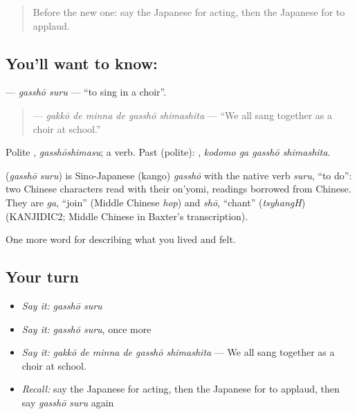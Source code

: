 \label{lesson:JA-C471-gasshou-suru}



\begin{quote}
Before the new one: say the Japanese for acting, then the Japanese for to applaud.
\end{quote}

\subsection*{You'll want to know: }
\textbf{} — \emph{gasshō suru} — \textquotedblleft{}to sing in a choir\textquotedblright{}.

\begin{quote}
\textbf{  } — \emph{gakkō de minna de gasshō shimashita} — \textquotedblleft{}We all sang together as a choir at school.\textquotedblright{}
\end{quote}

Polite \textbf{}, \emph{gasshōshimasu}; a  verb. Past (polite): \textbf{ }, \emph{kodomo ga gasshō shimashita}.

\begin{cousinweb}
\textbf{} (\emph{gasshō suru}) is Sino-Japanese (kango) \emph{gasshō} with the native verb \emph{suru}, \textquotedblleft{}to do\textquotedblright{}: two Chinese characters read with their on'yomi, readings borrowed from Chinese. They are \emph{ga}, \textquotedblleft{}join\textquotedblright{} (Middle Chinese \emph{hop}) and \emph{shō}, \textquotedblleft{}chant\textquotedblright{} (\emph{tsyhangH}) (KANJIDIC2; Middle Chinese in Baxter's transcription).
\end{cousinweb}

\begin{grammarlens}[title={What you've built}]
One more word for describing what you lived and felt.
\end{grammarlens}

\subsection*{Your turn}
\begin{itemize}
\raggedright
  \item \emph{Say it:} \emph{gasshō suru}
  \item \emph{Say it:} \emph{gasshō suru}, once more
  \item \emph{Say it:} \emph{gakkō de minna de gasshō shimashita} — We all sang together as a choir at school.
  \item \emph{Recall:} say the Japanese for acting, then the Japanese for to applaud, then say \emph{gasshō suru} again
\end{itemize}

